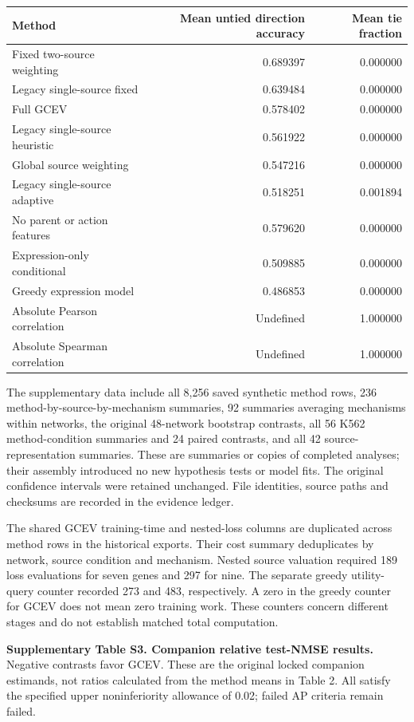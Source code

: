 \documentclass[
  11pt,
]{article}
\begin{document}
\begin{longtable}[]{@{}lrr@{}}
\toprule\noalign{}
Method & Mean untied direction accuracy & Mean tie fraction \\
\midrule\noalign{}
\endhead
\bottomrule\noalign{}
\endlastfoot
Fixed two-source weighting & 0.689397 & 0.000000 \\
Legacy single-source fixed & 0.639484 & 0.000000 \\
Full GCEV & 0.578402 & 0.000000 \\
Legacy single-source heuristic & 0.561922 & 0.000000 \\
Global source weighting & 0.547216 & 0.000000 \\
Legacy single-source adaptive & 0.518251 & 0.001894 \\
No parent or action features & 0.579620 & 0.000000 \\
Expression-only conditional & 0.509885 & 0.000000 \\
Greedy expression model & 0.486853 & 0.000000 \\
Absolute Pearson correlation & Undefined & 1.000000 \\
Absolute Spearman correlation & Undefined & 1.000000 \\
\end{longtable}

The supplementary data include all 8,256 saved synthetic method rows,
236 method-by-source-by-mechanism summaries, 92 summaries averaging
mechanisms within networks, the original 48-network bootstrap contrasts,
all 56 K562 method-condition summaries and 24 paired contrasts, and all
42 source-representation summaries. These are summaries or copies of
completed analyses; their assembly introduced no new hypothesis tests or
model fits. The original confidence intervals were retained unchanged.
File identities, source paths and checksums are recorded in the evidence
ledger.

The shared GCEV training-time and nested-loss columns are duplicated
across method rows in the historical exports. Their cost summary
deduplicates by network, source condition and mechanism. Nested source
valuation required 189 loss evaluations for seven genes and 297 for
nine. The separate greedy utility-query counter recorded 273 and 483,
respectively. A zero in the greedy counter for GCEV does not mean zero
training work. These counters concern different stages and do not
establish matched total computation.

\textbf{Supplementary Table S3. Companion relative test-NMSE results.}
Negative contrasts favor GCEV. These are the original locked companion
estimands, not ratios calculated from the method means in Table 2. All
satisfy the specified upper noninferiority allowance of 0.02; failed AP
criteria remain failed.
\end{document}
